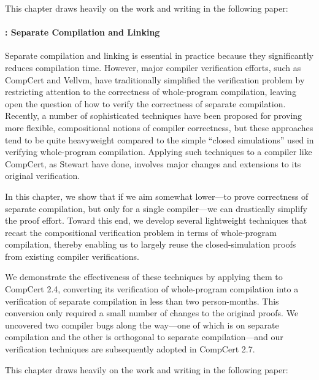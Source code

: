 This chapter draws heavily on the work and writing in the following paper:




\paragraph{: Separate Compilation and Linking}

Separate compilation and linking is essential in practice because they significantly reduces
compilation time.  However, major compiler verification efforts, such as CompCert and Vellvm, have
traditionally simplified the verification problem by restricting attention to the correctness of
whole-program compilation, leaving open the question of how to verify the correctness of separate
compilation.  Recently, a number of sophisticated techniques have been proposed for proving more
flexible, compositional notions of compiler correctness, but these approaches tend to be quite
heavyweight compared to the simple ``closed simulations'' used in verifying whole-program
compilation.  Applying such techniques to a compiler like CompCert, as Stewart \etal{} have done,
involves major changes and extensions to its original verification.

In this chapter, we show that if we aim somewhat lower---to prove correctness of separate
compilation, but only for a single compiler---we can drastically simplify the proof effort.  Toward
this end, we develop several lightweight techniques that recast the compositional verification
problem in terms of whole-program compilation, thereby enabling us to largely reuse the
closed-simulation proofs from existing compiler verifications.

We demonstrate the effectiveness of these techniques by applying them to CompCert 2.4, converting
its verification of whole-program compilation into a verification of separate compilation in less
than two person-months.  This conversion only required a small number of changes to the original
proofs.  We uncovered two compiler bugs along the way---one of which is on separate compilation and
the other is orthogonal to separate compilation---and our verification techniques are subsequently
adopted in CompCert 2.7.

This chapter draws heavily on the work and writing in the following paper:

